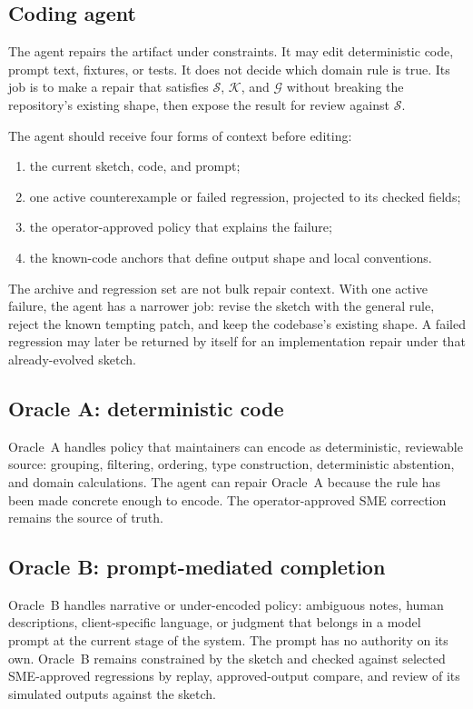 \documentclass[11pt]{article}
\newcommand{\sketch}{\mathcal{S}}
\newcommand{\anchors}{\mathcal{K}}
\newcommand{\gate}{\mathcal{G}}
\begin{document}
\subsection{Coding agent}

The agent repairs the artifact under constraints.  It may edit deterministic code, prompt
text, fixtures, or tests.  It does not decide which domain rule is true.  Its job is to
make a repair that satisfies $\sketch$, $\anchors$, and $\gate$ without breaking
the repository's existing shape, then expose the result for review against $\sketch$.

The agent should receive four forms of context before editing:

\begin{enumerate}
  \item the current sketch, code, and prompt;
  \item one active counterexample or failed regression, projected to its checked fields;
  \item the operator-approved policy that explains the failure;
  \item the known-code anchors that define output shape and local conventions.
\end{enumerate}

The archive and regression set are not bulk repair context.  With one active failure, the agent
has a narrower job: revise the sketch with the general rule, reject the known tempting patch, and
keep the codebase's existing shape.  A failed regression may later be returned by itself for an
implementation repair under that already-evolved sketch.

\subsection{Oracle A: deterministic code}

Oracle~A handles policy that maintainers can encode as deterministic, reviewable source:
grouping, filtering, ordering, type construction, deterministic abstention, and domain
calculations.  The agent can repair Oracle~A because the rule has been made concrete enough
to encode.  The operator-approved SME correction remains the source of truth.

\subsection{Oracle B: prompt-mediated completion}

Oracle~B handles narrative or under-encoded policy: ambiguous notes, human descriptions,
client-specific language, or judgment that belongs in a model prompt at the current stage
of the system.  The prompt has no authority on its own.  Oracle~B remains constrained by
the sketch and checked against selected SME-approved regressions by replay, approved-output
compare, and review of its simulated outputs against the sketch.
\end{document}
